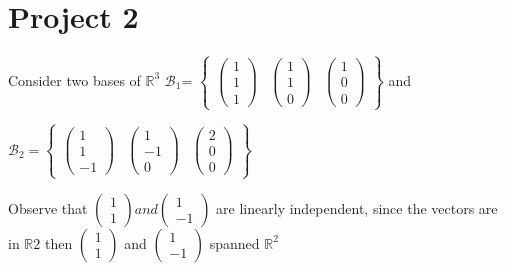 \documentclass[45pt]{article}
\begin{document}
\section{Project 2}
\Large{Consider two bases of $\mathbb{R}^3$}
$\mathcal{B}_1$=
$\begin{Bmatrix}
    \begin{pmatrix}
        1\\1\\1
    \end{pmatrix}&
    
\begin{pmatrix}
        1\\1\\0
\end{pmatrix}&
\begin{pmatrix}
        1\\0\\0
\end{pmatrix}
\end{Bmatrix}$ and 

$\mathcal{B}_2=
\begin{Bmatrix}
    \begin{pmatrix}
        1\\1\\-1
    \end{pmatrix}&
    
\begin{pmatrix}
        1\\-1\\0
\end{pmatrix}&
\begin{pmatrix}
        2\\0\\0
\end{pmatrix}
\end{Bmatrix}$


Observe that 
$\begin{pmatrix} 1\\1 \end{pmatrix} and 
\begin{pmatrix} 1\\-1 \end{pmatrix}$ are linearly independent, since the vectors are in $\mathbb{R}2$ 
then $\begin{pmatrix} 1\\1 \end{pmatrix}$ and 
$\begin{pmatrix} 1\\-1 \end{pmatrix}$ spanned  $\mathbb{R}^2$ \\
\end{document}
